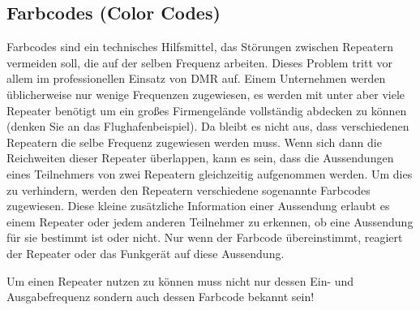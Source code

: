 \subsection{Farbcodes (Color Codes)} 
Farbcodes sind ein technisches Hilfsmittel, das Störungen zwischen Repeatern vermeiden soll, die auf der selben Frequenz arbeiten. Dieses Problem tritt vor allem im professionellen Einsatz von DMR auf. Einem Unternehmen werden üblicherweise nur wenige Frequenzen zugewiesen, es werden mit unter aber viele Repeater benötigt um ein großes Firmengelände vollständig abdecken zu können (denken Sie an das Flughafenbeispiel). Da bleibt es nicht aus, dass verschiedenen Repeatern die selbe Frequenz zugewiesen werden muss. Wenn sich dann die Reichweiten dieser Repeater überlappen, kann es sein, dass die Aussendungen eines Teilnehmers von zwei Repeatern gleichzeitig aufgenommen werden. Um dies zu verhindern, werden den Repeatern verschiedene sogenannte Farbcodes zugewiesen. Diese kleine zusätzliche Information einer Aussendung erlaubt es einem Repeater oder jedem anderen Teilnehmer zu erkennen, ob eine Aussendung für sie bestimmt ist oder nicht. Nur wenn der Farbcode übereinstimmt, reagiert der Repeater oder das Funkgerät auf diese Aussendung. 

\begin{merke}
 Um einen Repeater nutzen zu können muss nicht nur dessen Ein- und Ausgabefrequenz sondern auch dessen Farbcode bekannt sein!
\end{merke}